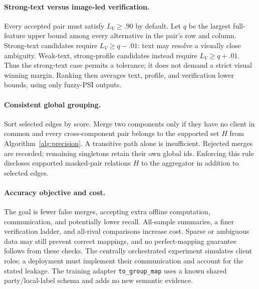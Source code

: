 \documentclass[11pt]{article}
\begin{document}
\paragraph{Strong-text versus image-led verification.}
Every accepted pair must satisfy $L_V\ge.90$ by default.
Let $q$ be the largest full-feature upper bound among every alternative in
the pair's row and column. Strong-text candidates require
$L_V\ge q-.01$: text may resolve a visually close ambiguity.
Weak-text, strong-profile candidates instead require $L_V\ge q+.01$.
Thus the strong-text case permits a tolerance; it does not demand a strict
visual winning margin. Ranking then averages text, profile, and verification
lower bounds, using only fuzzy-PSI outputs.

\paragraph{Consistent global grouping.}\label{alg:gid}
Sort selected edges by score. Merge two components only if they have no
client in common and every cross-component pair belongs to the supported set
$H$ from Algorithm~\ref{alg:precision}. A transitive path alone is insufficient.
Rejected merges are recorded; remaining singletons retain their own global ids.
Enforcing this rule discloses supported masked-pair relations $H$ to the
aggregator in addition to selected edges.

\paragraph{Accuracy objective and cost.}
The goal is fewer false merges, accepting extra offline computation,
communication, and potentially lower recall. All-sample summaries, a finer
verification ladder, and all-rival comparisons increase cost. Sparse or
ambiguous data may still prevent correct mappings, and no perfect-mapping
guarantee follows from these checks. The centrally orchestrated experiment
simulates client roles; a deployment must implement their communication and
account for the stated leakage. The training adapter \texttt{to\_group\_map}
uses a known shared party/local-label schema and adds no new semantic evidence.
\end{document}
